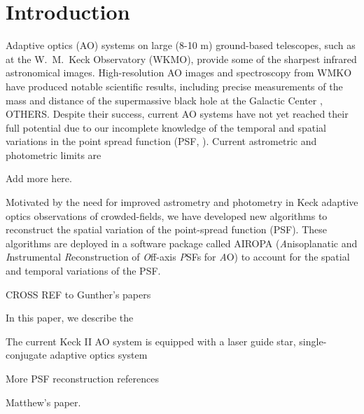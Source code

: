 \section{Introduction}

Adaptive optics (AO) systems on large (8-10 m)
ground-based telescopes, such as at the W.~M.~Keck Observatory (WKMO),
provide some of the sharpest infrared astronomical images. 
High-resolution AO images and spectroscopy from WMKO have produced 
notable scientific results, including precise measurements of the mass
and distance of the supermassive black hole at the Galactic Center
\cite{Ghez:2008,Meyer:2016}, OTHERS. 
Despite their success, current AO systems have not yet reached their
full potential due to our incomplete knowledge of the temporal and
spatial variations in the point spread function (PSF,
\cite{Davies:2012,Lu:2014}). 
Current astrometric and photometric limits are 
\begin{notes}
Add more here.
\end{notes}

Motivated by the need for improved astrometry and photometry in
Keck adaptive optics observations of crowded-fields, we have developed new
algorithms to reconstruct the spatial variation of the point-spread
function (PSF). 
These algorithms are deployed in a software package called
 AIROPA ({\it A}nisoplanatic and {\it I}nstrumental {\it
  R}econstruction of {\it O}ff-axis {\it P}SFs for {\it A}O) to
account for the spatial and temporal variations of the PSF. 
\begin{notes}
CROSS REF to Gunther's papers
\end{notes}
In this paper, we describe the 

The current Keck II AO system is equipped with a laser guide star,
single-conjugate adaptive optics system 

More PSF reconstruction references \cite{Steinbring:2005,Davies:2012,Trippe:2010}

Matthew's paper. \cite{Britton:2006}


